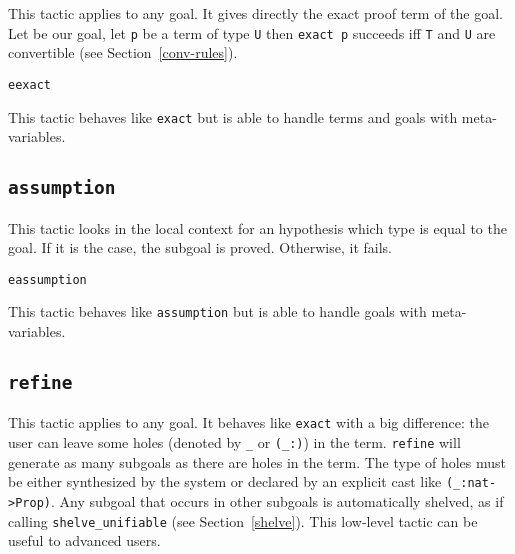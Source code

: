 This tactic applies to any goal. It gives directly the exact proof
term of the goal. Let {\T} be our goal, let {\tt p} be a term of type
{\tt U} then {\tt exact p} succeeds iff {\tt T} and {\tt U} are
convertible (see Section~\ref{conv-rules}).

\begin{ErrMsgs}
\item {}
\end{ErrMsgs}

\begin{Variants}
  \item \texttt{eexact \term}

    This tactic behaves like \texttt{exact} but is able to handle terms
    and goals with meta-variables.

\end{Variants}

\subsection{\tt assumption}

This tactic looks in the local context for an
hypothesis which type is equal to the goal.  If it is the case, the
subgoal is proved. Otherwise, it fails.

\begin{ErrMsgs}
\item  {}
\end{ErrMsgs}

\begin{Variants}
  \item \texttt{eassumption}

    This tactic behaves like \texttt{assumption} but is able to handle
    goals with meta-variables.

\end{Variants}

\subsection{\tt refine \term}
\label{refine}
\label{refine-example}

This tactic applies to any goal. It behaves like {\tt exact} with a big
difference: the user can leave some holes (denoted by \texttt{\_} or
{\tt (\_:\type)}) in the term. {\tt refine} will generate as
many subgoals as there are holes in the term. The type of holes must be
either synthesized by the system or declared by an
explicit cast like \verb|(_:nat->Prop)|. Any subgoal that occurs in other
subgoals is automatically shelved, as if calling {\tt shelve\_unifiable}
(see Section~\ref{shelve}).
This low-level tactic can be useful to advanced users.

